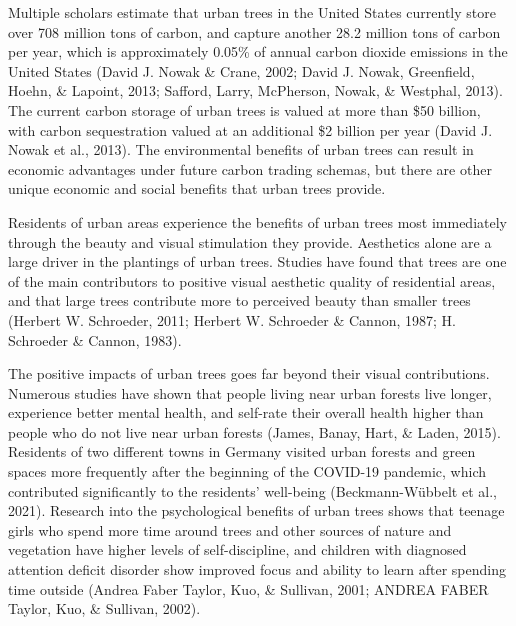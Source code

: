 \documentclass[12pt,twoside]{reedthesis}
\begin{document}
Multiple scholars estimate that urban trees in the United States currently store over 708 million tons of carbon, and capture another 28.2 million tons of carbon per year, which is approximately 0.05\% of annual carbon dioxide emissions in the United States (David J. Nowak \& Crane, 2002; David J. Nowak, Greenfield, Hoehn, \& Lapoint, 2013; Safford, Larry, McPherson, Nowak, \& Westphal, 2013). The current carbon storage of urban trees is valued at more than \$50 billion, with carbon sequestration valued at an additional \$2 billion per year (David J. Nowak et al., 2013). The environmental benefits of urban trees can result in economic advantages under future carbon trading schemas, but there are other unique economic and social benefits that urban trees provide.

Residents of urban areas experience the benefits of urban trees most immediately through the beauty and visual stimulation they provide. Aesthetics alone are a large driver in the plantings of urban trees. Studies have found that trees are one of the main contributors to positive visual aesthetic quality of residential areas, and that large trees contribute more to perceived beauty than smaller trees (Herbert W. Schroeder, 2011; Herbert W. Schroeder \& Cannon, 1987; H. Schroeder \& Cannon, 1983).

The positive impacts of urban trees goes far beyond their visual contributions. Numerous studies have shown that people living near urban forests live longer, experience better mental health, and self-rate their overall health higher than people who do not live near urban forests (James, Banay, Hart, \& Laden, 2015). Residents of two different towns in Germany visited urban forests and green spaces more frequently after the beginning of the COVID-19 pandemic, which contributed significantly to the residents' well-being (Beckmann-Wübbelt et al., 2021). Research into the psychological benefits of urban trees shows that teenage girls who spend more time around trees and other sources of nature and vegetation have higher levels of self-discipline, and children with diagnosed attention deficit disorder show improved focus and ability to learn after spending time outside (Andrea Faber Taylor, Kuo, \& Sullivan, 2001; ANDREA FABER Taylor, Kuo, \& Sullivan, 2002).
\end{document}
